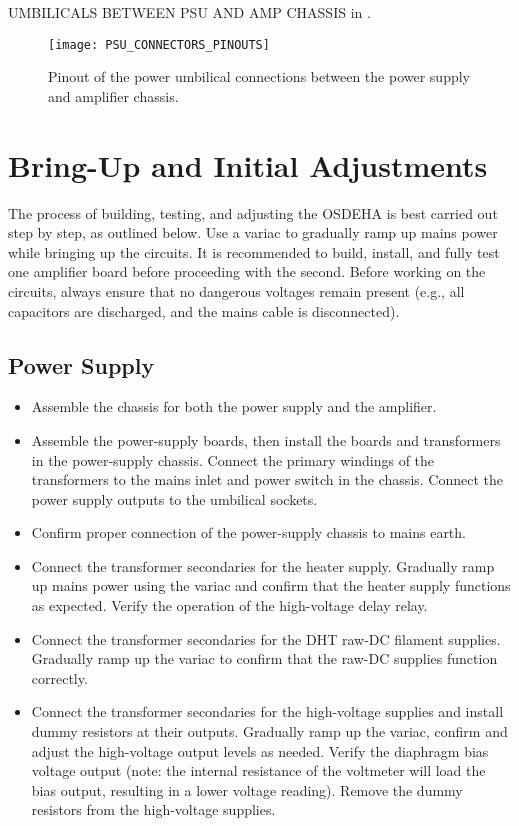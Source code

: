 UMBILICALS BETWEEN PSU AND AMP CHASSIS in .

\begin{figure}
\begin{center}
\texttt{[image: PSU\_CONNECTORS\_PINOUTS]}
\caption{Pinout of the power umbilical connections between the power supply and amplifier chassis.}
\end{center}
\end{figure}


\section{Bring-Up and Initial Adjustments}

The process of building, testing, and adjusting the OSDEHA is best carried out step by step, as outlined below. Use a variac to gradually ramp up mains power while bringing up the circuits. It is recommended to build, install, and fully test one amplifier board before proceeding with the second. Before working on the circuits, always ensure that no dangerous voltages remain present (e.g., all capacitors are discharged, and the mains cable is disconnected).

\subsection{Power Supply}
\begin{itemize}
\item Assemble the chassis for both the power supply and the amplifier.
\item Assemble the power-supply boards, then install the boards and transformers in the power-supply chassis. Connect the primary windings of the transformers to the mains inlet and power switch in the chassis. Connect the power supply outputs to the umbilical sockets.
\item Confirm proper connection of the power-supply chassis to mains earth.
\item Connect the transformer secondaries for the heater supply. Gradually ramp up mains power using the variac and confirm that the heater supply functions as expected. Verify the operation of the high-voltage delay relay.
\item Connect the transformer secondaries for the DHT raw-DC filament supplies. Gradually ramp up the variac to confirm that the raw-DC supplies function correctly.
\item Connect the transformer secondaries for the high-voltage supplies and install dummy resistors at their outputs. Gradually ramp up the variac, confirm and adjust the high-voltage output levels as needed. Verify the diaphragm bias voltage output (note: the internal resistance of the voltmeter will load the bias output, resulting in a lower voltage reading). Remove the dummy resistors from the high-voltage supplies.
\end{itemize}


